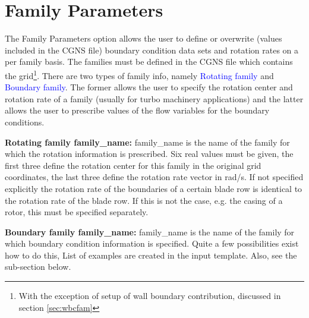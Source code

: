 \documentclass[12pt,epsf,colordvi]{article}
\begin{document}
\section{ Family Parameters} \label{sec:fampar}
%
The Family Parameters option allows the user to define or overwrite (values included in the CGNS file) boundary condition data sets and rotation rates on a per family basis. The families must be defined in the CGNS file which contains the grid\footnote{With the exception of setup of wall boundary contribution, discussed in section \ref{sec:wbcfam}}. There are two types of family info, namely \textcolor{blue}{Rotating family} and \textcolor{blue}{Boundary family}. The former allows the user to specify the rotation center and rotation rate of a family (usually for turbo machinery applications) and the latter allows the user to prescribe values of the flow variables for the boundary conditions.
%
\begin{description}
%
	\item{\bf Rotating family family\_name:} family\_name is the name of the family for which the rotation information is prescribed. Six real values must be given, the first three define the rotation center for this family in the original grid coordinates, the last three define the rotation rate vector in rad/s. If not specified explicitly the rotation rate of the boundaries of a certain blade row is identical to the rotation rate of the blade row. If this is not the case, e.g. the casing of a rotor, this must be specified separately.
%
	\item{\bf Boundary family family\_name:} family\_name is the name of the family for which boundary condition information is specified. Quite a few possibilities exist how to do this, List of examples are created in the input template. Also, see the sub-section below.
%
 \end{description}
%
%
\noindent 
\end{document}
